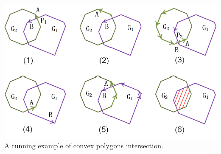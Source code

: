 \begin{figure}[tb!]
\centering
\includegraphics[scale=0.88]{figures/Fig-convex-poly-inter.png}
\vspace{-1ex}
\caption{\small A running example of convex polygons intersection.}
\vspace{-2ex}
\label{fig:c-poly-inter}
\end{figure}





